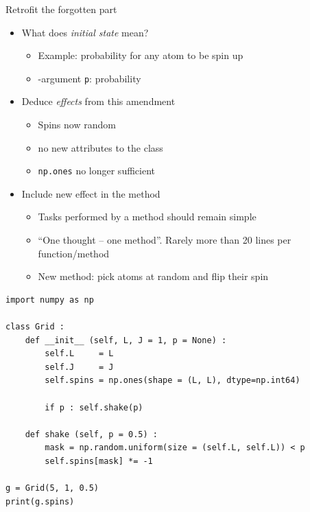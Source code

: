 
\begin{frame}[fragile]{Retrofit the forgotten part}
%
\begin{itemize}
\item What does \emph{initial state} mean?
	\begin{itemize}
	\item Example: probability for any atom to be spin up
	\item[\Thus] -argument \texttt{p}: probability
	\end{itemize}
\item Deduce \emph{effects} from this amendment
	\begin{itemize}
	\item Spins now random
	\item[\Thus] no new attributes to the class
	\item[\Thus] \texttt{np.ones} no longer sufficient
	\end{itemize}
\item Include new effect in the method
	\begin{itemize}
	\item Tasks performed by a method should remain simple
	\item \enquote{One thought -- one method}. Rarely more than 20 lines per function/method
	\item New method: pick atoms at random and flip their spin
	\end{itemize}
\end{itemize}
%
\end{frame}


\begin{frame}[fragile]
%
\begin{codebox}
\begin{verbatim}
import numpy as np

class Grid :
    def __init__ (self, L, J = 1, p = None) :
        self.L     = L
        self.J     = J
        self.spins = np.ones(shape = (L, L), dtype=np.int64)
        
        if p : self.shake(p)
        
    def shake (self, p = 0.5) :
        mask = np.random.uniform(size = (self.L, self.L)) < p
        self.spins[mask] *= -1

g = Grid(5, 1, 0.5)
print(g.spins)
\end{verbatim}
\end{codebox}
%
\end{frame}

